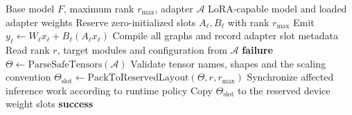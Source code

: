 \documentclass[11pt]{article}
\begin{document}
\begin{minipage}{17cm}
\begin{algorithm}[H]
\caption{Compile-Time LoRA Reservation and Runtime Loading}
\begin{algorithmic}[1]
\Require Base model $F$, maximum rank $r_{\max}$, adapter $\mathcal{A}$
\Ensure LoRA-capable model and loaded adapter weights
    \State Reserve zero-initialized slots $A_{\ell}, B_{\ell}$ with rank $r_{\max}$
    \State Emit $y_{\ell} \gets W_{\ell}x_{\ell}+B_{\ell}(A_{\ell}x_{\ell})$
\EndFor
\State Compile all graphs and record adapter slot metadata
\State Read rank $r$, target modules and configuration from $\mathcal{A}$
    \State \Return \textbf{failure}
\EndIf
\State $\Theta \gets \mathrm{ParseSafeTensors}(\mathcal{A})$
\State Validate tensor names, shapes and the scaling convention
\State $\Theta_{\mathrm{slot}} \gets \mathrm{PackToReservedLayout}(\Theta,r,r_{\max})$
\State Synchronize affected inference work according to runtime policy
\State Copy $\Theta_{\mathrm{slot}}$ to the reserved device weight slots
\State \Return \textbf{success}
\end{algorithmic}
\end{algorithm}
\end{minipage}
\end{document}
